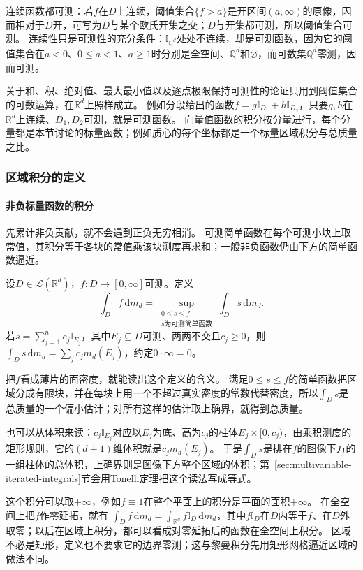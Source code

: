 连续函数都可测：若$f$在$D$上连续，阈值集合$\{f>a\}$是开区间$(a,\infty)$的原像，因而相对于$D$开，可写为$D$与某个欧氏开集之交；$D$与开集都可测，所以阈值集合可测。
连续性只是可测性的充分条件：$\mathbb I_{\mathbb Q^d}$处处不连续，却是可测函数，因为它的阈值集合在$a<0$、$0\leq a<1$、$a\geq1$时分别是全空间、$\mathbb Q^d$和$\varnothing$，而可数集$\mathbb Q^d$零测，因而可测。

关于和、积、绝对值、最大最小值以及逐点极限保持可测性的论证只用到阈值集合的可数运算，在$\mathbb R^d$上照样成立。
例如分段给出的函数$f=g\mathbb I_{D_1}+h\mathbb I_{D_2}$，只要$g,h$在$\mathbb R^d$上连续、$D_1,D_2$可测，就是可测函数。
向量值函数的积分按分量进行，每个分量都是本节讨论的标量函数；例如质心的每个坐标都是一个标量区域积分与总质量之比。

\subsubsection{区域积分的定义}

\paragraph{非负标量函数的积分}

先累计非负贡献，就不会遇到正负无穷相消。
可测简单函数在每个可测小块上取常值，其积分等于各块的常值乘该块测度再求和；一般非负函数仍由下方的简单函数逼近。
\begin{definition}[区域上非负可测函数的积分]
设$D\in\mathcal L(\mathbb R^d)$，$f:D\to[0,\infty]$可测。定义
\[
 \int_D f\,\mathrm dm_d
 =\sup_{\substack{0\leq s\leq f\\s\text{为可测简单函数}}}
 \int_D s\,\mathrm dm_d.
\]
若$s=\sum_{j=1}^n c_j\mathbb I_{E_j}$，其中$E_j\subseteq D$可测、两两不交且$c_j\geq0$，则$\int_Ds\,\mathrm dm_d=\sum_jc_jm_d(E_j)$，约定$0\cdot\infty=0$。
\end{definition}

把$f$看成薄片的面密度，就能读出这个定义的含义。
满足$0\leq s\leq f$的简单函数把区域分成有限块，并在每块上用一个不超过真实密度的常数代替密度，所以$\int_Ds$是总质量的一个偏小估计；对所有这样的估计取上确界，就得到总质量。

也可以从体积来读：$c_j\mathbb I_{E_j}$对应以$E_j$为底、高为$c_j$的柱体$E_j\times[0,c_j)$，由乘积测度的矩形规则，它的$(d+1)$维体积就是$c_jm_d(E_j)$。
于是$\int_Ds$是排在$f$的图像下方的一组柱体的总体积，上确界则是图像下方整个区域的体积；第~\ref{sec:multivariable-iterated-integrals}节会用Tonelli定理把这个读法写成等式。

这个积分可以取$+\infty$，例如$f\equiv1$在整个平面上的积分是平面的面积$+\infty$。
在全空间上把$f$作零延拓，就有
$\int_Df\,\mathrm dm_d=\int_{\mathbb R^d}f\mathbb I_D\,\mathrm dm_d$，其中$f\mathbb I_D$在$D$内等于$f$、在$D$外取零；以后在区域上积分，都可以看成对零延拓后的函数在全空间上积分。
区域不必是矩形，定义也不要求它的边界零测；这与黎曼积分先用矩形网格逼近区域的做法不同。

